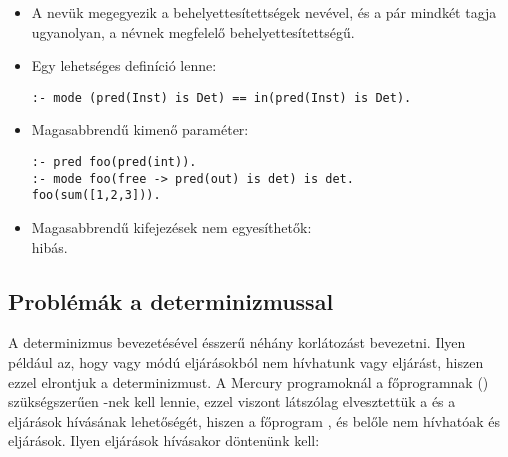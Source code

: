 \begin{itemize}
\item A nevük megegyezik a behelyettesítettségek nevével, és a pár mindkét
tagja ugyanolyan, a névnek megfelelő behelyettesítettségű.
\item Egy lehetséges definíció lenne:
\begin{verbatim}
:- mode (pred(Inst) is Det) == in(pred(Inst) is Det).
\end{verbatim}
\end{itemize}

\begin{itemize}
\item Magasabbrendű kimenő paraméter:
\begin{verbatim}
:- pred foo(pred(int)).
:- mode foo(free -> pred(out) is det) is det.
foo(sum([1,2,3])).
\end{verbatim}
\item Magasabbrendű kifejezések nem egyesíthetők:\\
 hibás.
\end{itemize}

\subsection{Problémák a determinizmussal}

A determinizmus bevezetésével ésszerű néhány korlátozást bevezetni. Ilyen például az,
hogy  vagy  módú eljárásokból nem hívhatunk  vagy
 eljárást, hiszen ezzel elrontjuk a determinizmust. A Mercury programoknál a
főprogramnak () szükségszerűen -nek kell lennie, ezzel viszont
látszólag elvesztettük a  és a  eljárások hívásának lehetőségét,
hiszen a főprogram , és belőle nem hívhatóak  és  eljárások.
Ilyen eljárások hívásakor döntenünk kell:

